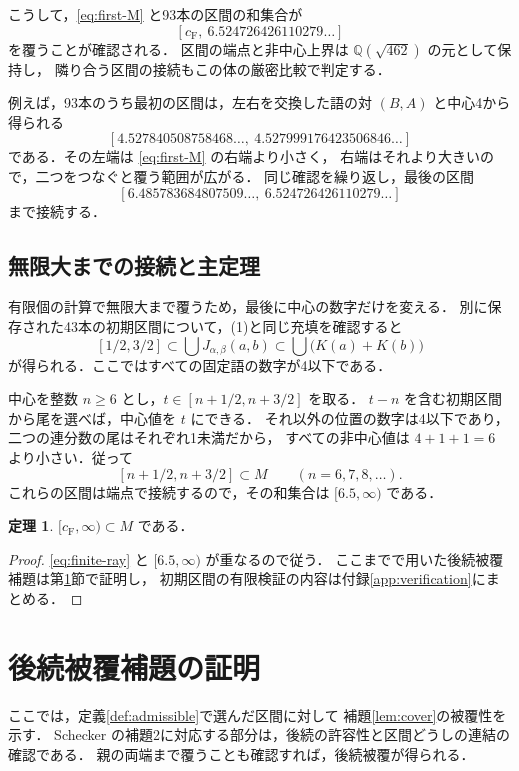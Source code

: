 \documentclass[11pt,a4paper]{article}
\theoremstyle{definition}
\newtheorem{theorem}{定理}
\newcommand{\CF}{c_{\mathrm F}}
\begin{document}
こうして，\eqref{eq:first-M} と93本の区間の和集合が
\begin{equation}\label{eq:finite-ray}
 [\CF,\ 6.524726426110279\ldots]
\end{equation}
を覆うことが確認される．
区間の端点と非中心上界は $\mathbb Q(\sqrt{462})$ の元として保持し，
隣り合う区間の接続もこの体の厳密比較で判定する．

例えば，93本のうち最初の区間は，左右を交換した語の対 $(B,A)$ と中心4から得られる
\[
 [4.527840508758468\ldots,\ 4.527999176423506846\ldots]
\]
である．その左端は \eqref{eq:first-M} の右端より小さく，
右端はそれより大きいので，二つをつなぐと覆う範囲が広がる．
同じ確認を繰り返し，最後の区間
\[
 [6.485783684807509\ldots,\ 6.524726426110279\ldots]
\]
まで接続する．

\subsection{無限大までの接続と主定理}
有限個の計算で無限大まで覆うため，最後に中心の数字だけを変える．
別に保存された43本の初期区間について，(1)と同じ充填を確認すると
\[
 [1/2,3/2]\subset\bigcup J_{\alpha,\beta}(a,b)
              \subset\bigcup\bigl(K(a)+K(b)\bigr)
\]
が得られる．ここではすべての固定語の数字が4以下である．

中心を整数 $n\ge6$ とし，$t\in[n+1/2,n+3/2]$ を取る．
$t-n$ を含む初期区間から尾を選べば，中心値を $t$ にできる．
それ以外の位置の数字は4以下であり，二つの連分数の尾はそれぞれ1未満だから，
すべての非中心値は $4+1+1=6$ より小さい．従って
\[
 [n+1/2,n+3/2]\subset M\qquad(n=6,7,8,\ldots).
\]
これらの区間は端点で接続するので，その和集合は $[6.5,\infty)$ である．

\begin{theorem}\label{thm:main}
$[\CF,\infty)\subset M$ である．
\end{theorem}
\begin{proof}
\eqref{eq:finite-ray} と $[6.5,\infty)$ が重なるので従う．
ここまでで用いた後続被覆補題は第\ref{sec:cover-proof}節で証明し，
初期区間の有限検証の内容は付録\ref{app:verification}にまとめる．
\end{proof}

\section{後続被覆補題の証明}\label{sec:cover-proof}

ここでは，定義\ref{def:admissible}で選んだ区間に対して
補題\ref{lem:cover}の被覆性を示す．
Schecker の補題2に対応する部分は，後続の許容性と区間どうしの連結の確認である．
親の両端まで覆うことも確認すれば，後続被覆が得られる．
\end{document}
